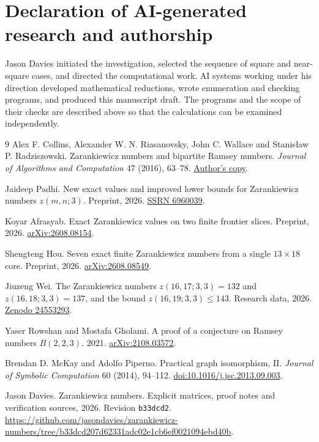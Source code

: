 \documentclass[11pt]{article}
\newcommand{\code}[1]{\nolinkurl{#1}}
\begin{document}
\section*{Declaration of AI-generated research and authorship}
Jason Davies initiated the investigation, selected the sequence of
square and near-square cases, and directed the computational work.
AI systems working under his direction developed mathematical reductions,
wrote enumeration and checking programs, and produced this manuscript
draft. The programs and the scope of their checks are described above
so that the calculations can be examined independently.

\begin{thebibliography}{9}
Alex F. Collins, Alexander W. N. Riasanovsky, John C. Wallace and
Stanis\l aw P. Radziszowski.
Zarankiewicz numbers and bipartite Ramsey numbers.
\emph{Journal of Algorithms and Computation} 47 (2016), 63--78.
\href{https://www.cs.rit.edu/~spr/PUBL/crwr16.pdf}{Author's copy}.

Jaideep Padhi.
New exact values and improved lower bounds for Zarankiewicz numbers
$z(m,n;3)$. Preprint, 2026.
\href{https://papers.ssrn.com/sol3/papers.cfm?abstract_id=6960039}{SSRN 6960039}.

Koyar Afrasyab. Exact Zarankiewicz values on two finite frontier slices.
Preprint, 2026. \href{https://arxiv.org/abs/2608.08154}{arXiv:2608.08154}.

Shengteng Hou. Seven exact finite Zarankiewicz numbers from a single
$13\times18$ core. Preprint, 2026.
\href{https://arxiv.org/abs/2608.08549}{arXiv:2608.08549}.

Jiuzeng Wei. The Zarankiewicz numbers $z(16,17;3,3)=132$ and $z(16,18;3,3)=137$,
and the bound $z(16,19;3,3)\le143$. Research data, 2026.
\href{https://doi.org/10.5281/zenodo.24553293}{Zenodo 24553293}.

Yaser Rowshan and Mostafa Gholami. A proof of a conjecture on Ramsey
numbers $B(2,2,3)$. 2021.
\href{https://arxiv.org/abs/2108.03572}{arXiv:2108.03572}.

Brendan D. McKay and Adolfo Piperno.
Practical graph isomorphism, II.
\emph{Journal of Symbolic Computation} 60 (2014), 94--112.
\href{https://doi.org/10.1016/j.jsc.2013.09.003}{doi:10.1016/j.jsc.2013.09.003}.

Jason Davies. Zarankiewicz numbers. Explicit matrices, proof notes and
verification sources, 2026. Revision \code{b33dcd2}.
\url{https://github.com/jasondavies/zarankiewicz-numbers/tree/b33dcd207d62331adc02e1cb6ef0021094ebd40b}.
\end{thebibliography}
\end{document}
